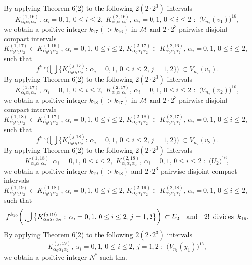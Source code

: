 \documentclass[12pt]{article}
\newcommand{\al}{\alpha}
\begin{document}
\indent By applying Theorem 6(2) to the following $2(2 \cdot 2^3)$ intervals 
$$
K_{\al_0\al_1\al_2}^{(1,16)}, \, \al_i = 0, 1, \, 0 \le i \le 2, \,\, K_{\al_0\al_1\al_2}^{(2,16)}, \, \al_i = 0, 1, \, 0 \le i \le 2 \,\, : \,\, \big(V_{n_2}(v_1)\big)^{16},
$$
we obtain a positive integer $k_{17} \, (> k_{16})$ in $\mathcal M$ and $2 \cdot 2^3$ pairwise disjoint compact intervals $K_{\al_0\al_1\al_2}^{(1,17)} \subset K_{\al_0\al_1\al_2}^{(1,16)}, \, \al_i = 0, 1, \, 0 \le i \le 2, \, K_{\al_0\al_1\al_2}^{(2,17)} \subset K_{\al_0\al_1\al_2}^{(2,16)}, \, \al_i = 0, 1, \, 0 \le i \le 2$, such that 
$$
f^{k_{17}}\bigg(\bigcup \big\{ K_{\al_0\al_1\al_2}^{(j,17)}: \, \al_i = 0, 1, \, 0 \le i \le 2, \, j = 1, 2 \big\}\bigg) \, \subset V_{n_2}(v_1).
$$
\indent By applying Theorem 6(2) to the following $2(2 \cdot 2^3)$ intervals 
$$
K_{\al_0\al_1\al_2}^{(1,17)}, \, \al_i = 0, 1, \, 0 \le i \le 2, \,\, K_{\al_0\al_1\al_2}^{(2,17)}, \, \al_i = 0, 1, \, 0 \le i \le 2 \,\, : \,\, \big(V_{n_2}(v_2)\big)^{16},
$$
we obtain a positive integer $k_{18} \, (> k_{17})$ in $\mathcal M$ and $2 \cdot 2^3$ pairwise disjoint compact intervals $K_{\al_0\al_1\al_2}^{(1,18)} \subset K_{\al_0\al_1\al_2}^{(1,17)}, \, \al_i = 0, 1, \, 0 \le i \le 2, \, K_{\al_0\al_1\al_2}^{(2,18)} \subset K_{\al_0\al_1\al_2}^{(2,17)}, \, \al_i = 0, 1, \, 0 \le i \le 2$, such that 
$$
f^{k_{18}}\bigg(\bigcup \big\{ K_{\al_0\al_1\al_2}^{(j,18)}: \, \al_i = 0, 1, \, 0 \le i \le 2, \, j = 1, 2 \big\}\bigg) \, \subset V_{n_2}(v_2).
$$
\indent By applying Theorem 6(2) to the following $2(2 \cdot 2^3)$ intervals 
$$
K_{\al_0\al_1\al_2}^{(1,18)}, \, \al_i = 0, 1, \, 0 \le i \le 2, \,\, K_{\al_0\al_1\al_2}^{(2,18)}, \, \al_i = 0, 1, \, 0 \le i \le 2 \,\, : \,\, \big(U_2\big)^{16},
$$
we obtain a positive integer $k_{19} \, (> k_{18})$ and $2 \cdot 2^3$ pairwise disjoint compact intervals $K_{\al_0\al_1\al_2}^{(1,19)} \subset K_{\al_0\al_1\al_2}^{(1,18)}, \, \al_i = 0, 1, \, 0 \le i \le 2, \, K_{\al_0\al_1\al_2}^{(2,19)} \subset K_{\al_0\al_1\al_2}^{(2,18)}, \, \al_i = 0, 1, \, 0 \le i \le 2$, such that 
$$
f^{k_{19}}\bigg(\bigcup \big\{ K_{\al_0\al_1\al_2}^{(j,19)}: \, \al_i = 0, 1, \, 0 \le i \le 2, \, j = 1, 2 \big\}\bigg) \, \subset U_2 \quad \text{and} \quad 2! \,\,\, \text{divides} \,\,\, k_{19}. \vspace{.1in}
$$           
\indent By applying Theorem 6(2) to the following $2(2 \cdot 2^3)$ intervals 
$$
K_{\al_0\al_1\al_2}^{(j,19)}, \, \al_i = 0, 1, \, 0 \le i \le 2, \, j = 1, 2 \,\, : \,\, \big(V_{n_2}(y_1)\big)^{16},
$$
we obtain a positive integer $N^*$ such that 
\end{document}
